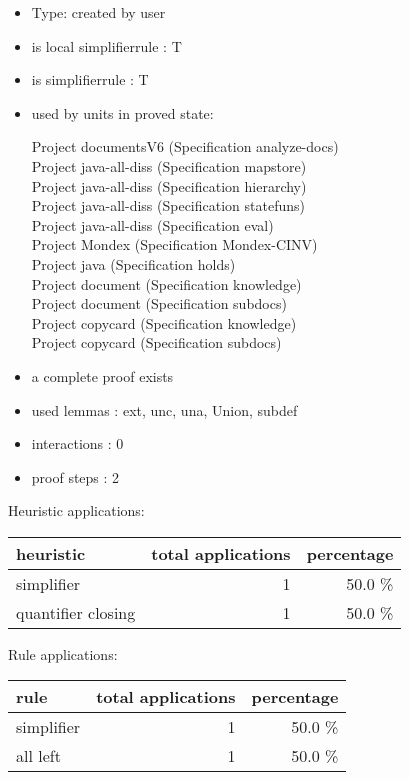 \documentclass[a4paper]{article}
\begin{document}
\begin{itemize}

\item Type: created by user

\item is local simplifierrule : T
\item is simplifierrule : T
\item used by units in proved state:

Project documentsV6 (Specification analyze-docs) \\
Project java-all-diss (Specification mapstore) \\
Project java-all-diss (Specification hierarchy) \\
Project java-all-diss (Specification statefuns) \\
Project java-all-diss (Specification eval) \\
Project Mondex (Specification Mondex-CINV) \\
Project java (Specification holds) \\
Project document (Specification knowledge) \\
Project document (Specification subdocs) \\
Project copycard (Specification knowledge) \\
Project copycard (Specification subdocs)
\item       a complete proof exists
\item       used lemmas  : ext, unc, una, Union, subdef
\item       interactions : 0
\item       proof steps  : 2
\end{itemize}

\medskip


Heuristic applications:

\begin{supertabular}{l|r|r}
heuristic	& total applications & percentage \\ \hline
simplifier & 1 & 50.0 \% \\
quantifier closing & 1 & 50.0 \% \\

\end{supertabular}

Rule applications:

\begin{supertabular}{l|r|r}
rule	        & total applications & percentage \\ \hline
simplifier & 1 & 50.0 \% \\
all left & 1 & 50.0 \% \\

\end{supertabular}
\end{document}
